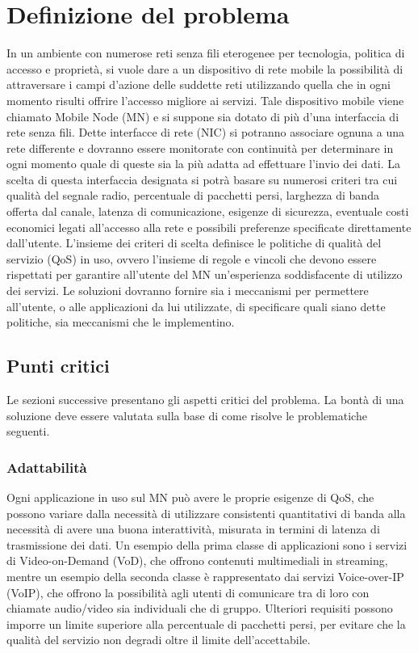 \documentclass[12pt,a4paper,openright,twoside]{book}
\begin{document}
\chapter{Definizione del problema}
\lhead[\fancyplain{}{\bfseries\thepage}]{\fancyplain{}{\bfseries\rightmark}}
 In un ambiente con numerose reti senza fili
eterogenee per tecnologia, politica di accesso e proprietà, si vuole
dare a un dispositivo di rete mobile la possibilità di attraversare i
campi d'azione delle suddette reti utilizzando quella che in ogni
momento risulti offrire l'accesso migliore ai servizi. Tale
dispositivo mobile viene chiamato Mobile Node (MN) e si suppone sia
dotato di più d'una interfaccia di rete senza fili. Dette interfacce
di rete (NIC) si potranno associare ognuna a una rete differente e
dovranno essere monitorate con continuità per determinare in ogni
momento quale di queste sia la più adatta ad effettuare l'invio dei
dati. La scelta di questa interfaccia designata si potrà basare su
numerosi criteri tra cui qualità del segnale radio, percentuale di
pacchetti persi, larghezza di banda offerta dal canale, latenza di
comunicazione, esigenze di sicurezza, eventuale costi economici legati
all'accesso alla rete e possibili preferenze specificate direttamente
dall'utente. L'insieme dei criteri di scelta definisce le politiche di
qualità del servizio (QoS) in uso, ovvero l'insieme di regole e
vincoli che devono essere rispettati per garantire all'utente del MN
un'esperienza soddisfacente di utilizzo dei servizi. Le soluzioni
dovranno fornire sia i meccanismi per permettere all'utente, o alle
applicazioni da lui utilizzate, di specificare quali siano dette
politiche, sia meccanismi che le implementino.

\section{Punti critici}
\label{sec:punti-critici}
Le sezioni successive presentano gli aspetti critici del problema. La
bontà di una soluzione deve essere valutata sulla base di come risolve
le problematiche seguenti.

\subsection{Adattabilità}
Ogni applicazione in uso sul MN può avere le proprie esigenze di QoS,
che possono variare dalla necessità di utilizzare consistenti
quantitativi di banda alla necessità di avere una buona interattività,
misurata in termini di latenza di trasmissione dei dati. Un esempio
della prima classe di applicazioni sono i servizi di Video-on-Demand
(VoD), che offrono contenuti multimediali in streaming, mentre un
esempio della seconda classe è rappresentato dai servizi Voice-over-IP
(VoIP), che offrono la possibilità agli utenti di comunicare tra di
loro con chiamate audio/video sia individuali che di gruppo. Ulteriori
requisiti possono imporre un limite superiore alla percentuale di
pacchetti persi, per evitare che la qualità del servizio non degradi
oltre il limite dell'accettabile.
\end{document}
